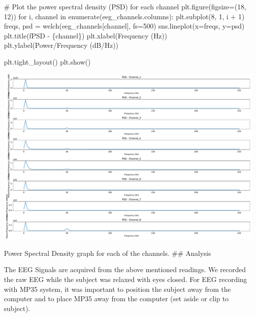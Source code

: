 \documentclass[
  11pt,
  letterpaper,
  DIV=11,
  numbers=noendperiod]{scrreprt}
\newenvironment{Shaded}{\begin{snugshade}}{\end{snugshade}}
\newcommand{\BuiltInTok}[1]{\textcolor[rgb]{0.00,0.23,0.31}{#1}}
\newcommand{\CommentTok}[1]{\textcolor[rgb]{0.37,0.37,0.37}{#1}}
\newcommand{\ControlFlowTok}[1]{\textcolor[rgb]{0.00,0.23,0.31}{#1}}
\newcommand{\DecValTok}[1]{\textcolor[rgb]{0.68,0.00,0.00}{#1}}
\newcommand{\KeywordTok}[1]{\textcolor[rgb]{0.00,0.23,0.31}{#1}}
\newcommand{\NormalTok}[1]{\textcolor[rgb]{0.00,0.23,0.31}{#1}}
\newcommand{\OperatorTok}[1]{\textcolor[rgb]{0.37,0.37,0.37}{#1}}
\newcommand{\SpecialCharTok}[1]{\textcolor[rgb]{0.37,0.37,0.37}{#1}}
\newcommand{\SpecialStringTok}[1]{\textcolor[rgb]{0.13,0.47,0.30}{#1}}
\newcommand{\StringTok}[1]{\textcolor[rgb]{0.13,0.47,0.30}{#1}}
\begin{document}
\begin{Shaded}
\begin{Highlighting}[]
\CommentTok{\# Plot the power spectral density (PSD) for each channel}
\NormalTok{plt.figure(figsize}\OperatorTok{=}\NormalTok{(}\DecValTok{18}\NormalTok{, }\DecValTok{12}\NormalTok{))}
\ControlFlowTok{for}\NormalTok{ i, channel }\KeywordTok{in} \BuiltInTok{enumerate}\NormalTok{(eeg\_channels.columns):}
\NormalTok{    plt.subplot(}\DecValTok{8}\NormalTok{, }\DecValTok{1}\NormalTok{, i }\OperatorTok{+} \DecValTok{1}\NormalTok{)}
\NormalTok{    freqs, psd }\OperatorTok{=}\NormalTok{ welch(eeg\_channels[channel], fs}\OperatorTok{=}\DecValTok{500}\NormalTok{)}
\NormalTok{    sns.lineplot(x}\OperatorTok{=}\NormalTok{freqs, y}\OperatorTok{=}\NormalTok{psd)}
\NormalTok{    plt.title(}\SpecialStringTok{f\textquotesingle{}PSD {-} }\SpecialCharTok{\{}\NormalTok{channel}\SpecialCharTok{\}}\SpecialStringTok{\textquotesingle{}}\NormalTok{)}
\NormalTok{    plt.xlabel(}\StringTok{\textquotesingle{}Frequency (Hz)\textquotesingle{}}\NormalTok{)}
\NormalTok{    plt.ylabel(}\StringTok{\textquotesingle{}Power/Frequency (dB/Hz)\textquotesingle{}}\NormalTok{)}

\NormalTok{plt.tight\_layout()}
\NormalTok{plt.show()}
\end{Highlighting}
\end{Shaded}

\includegraphics{eeg_files/figure-pdf/unnamed-chunk-3-3.pdf}

Power Spectral Density graph for each of the channels. \#\# Analysis

The EEG Signals are acquired from the above mentioned readings. We
recorded the raw EEG while the subject was relaxed with eyes closed. For
EEG recording with MP35 system, it was important to position the subject
away from the computer and to place MP35 away from the computer (set
aside or clip to subject).
\end{document}
